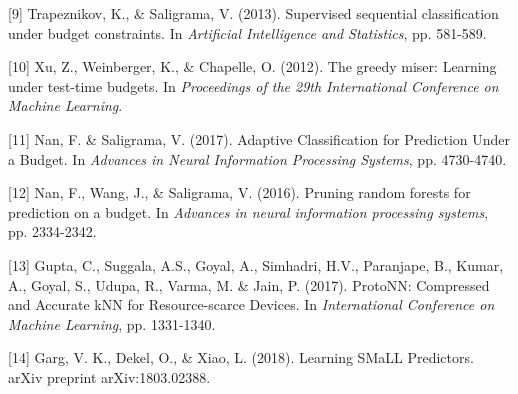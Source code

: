 \documentclass{article}
\begin{document}
[9] Trapeznikov, K., \& Saligrama, V. (2013). Supervised sequential classification under budget constraints. In {\it Artificial Intelligence and Statistics}, pp. 581-589.

[10] Xu, Z., Weinberger, K., \& Chapelle, O. (2012). The greedy miser: Learning under test-time budgets. In {\it Proceedings of the 29th International Conference on Machine Learning}.

[11] Nan, F. \& Saligrama, V. (2017). Adaptive Classification for Prediction Under a Budget. In {\it Advances in Neural Information Processing Systems}, pp. 4730-4740.

[12] Nan, F., Wang, J., \& Saligrama, V. (2016). Pruning random forests for prediction on a budget. In {\it Advances in neural information processing systems}, pp. 2334-2342.

[13] Gupta, C., Suggala, A.S., Goyal, A., Simhadri, H.V., Paranjape, B., Kumar, A., Goyal, S., Udupa, R., Varma, M. \& Jain, P. (2017). ProtoNN: Compressed and Accurate kNN for Resource-scarce Devices. In {\it International Conference on Machine Learning}, pp. 1331-1340.

[14] Garg, V. K., Dekel, O., \& Xiao, L. (2018). Learning SMaLL Predictors. arXiv preprint arXiv:1803.02388.
\end{document}
